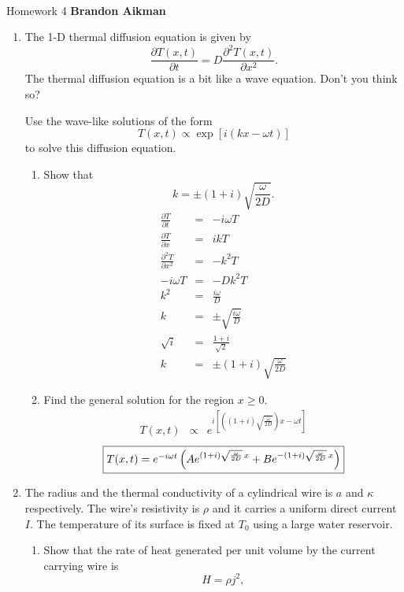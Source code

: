 \documentclass[12pt]{article}
\begin{document}
 \\
Homework 4 \hfill {\bf Brandon Aikman}

\begin{enumerate}
	\item The 1-D thermal diffusion equation is given by
	$$ \frac{\partial T(x,t)}{\partial t} = D \frac{\partial^2 T(x,t)}{\partial x^2}. $$
	The thermal diffusion equation is a bit like a wave equation. Don’t you think so?

	Use the wave-like solutions of the form
	$$T(x,t) \propto \exp[i(kx - \omega t)]$$
	to solve this diffusion equation.

	\begin{enumerate}
		\item Show that
			$$k = \pm (1 + i)\sqrt{\frac{\omega}{2D}}.$$
			\begin{eqnarray*}
				\frac{\partial T}{\partial t} &=& -i\omega T \\
				\frac{\partial T}{\partial x} &=& ikT \\
				\frac{\partial^2 T}{\partial x^2} &=& -k^2 T \\
				-i\omega T &=& -Dk^2 T \\
				k^2 &=& \frac{i\omega}{D} \\
				k &=& \pm \sqrt{\frac{i\omega}{D}} \\
				\sqrt{i} &=& \frac{1+i}{\sqrt{2}} \\
				k &=& \pm (1+i)\sqrt{\frac{\omega}{2D}}
			\end{eqnarray*}
		\item Find the general solution for the region $x \ge 0$.
		\begin{eqnarray*}
			T(x,t) &\propto& e^{i\left[((1+i)\sqrt{\frac{\omega}{2D}})x - \omega t\right]}
		\end{eqnarray*}
		$$\fbox{$T(x,t) = e^{-i\omega t} \left( A e^{(1+i)\sqrt{\frac{\omega}{2D}}\,x} + B e^{-(1+i)\sqrt{\frac{\omega}{2D}}\,x} \right)$}$$
	\end{enumerate}	
	\pagebreak
	\item The radius and the thermal conductivity of a cylindrical wire is $a$ and $\kappa$ respectively. The wire’s resistivity is $\rho$ and it carries a uniform direct current $I$. The temperature of its surface is fixed at $T_0$ using a large water reservoir.
	\begin{enumerate}
		\item Show that the rate of heat generated per unit volume by the current carrying wire is $$H = \rho j^2,$$

\end{enumerate}
\end{enumerate}
\end{document}

